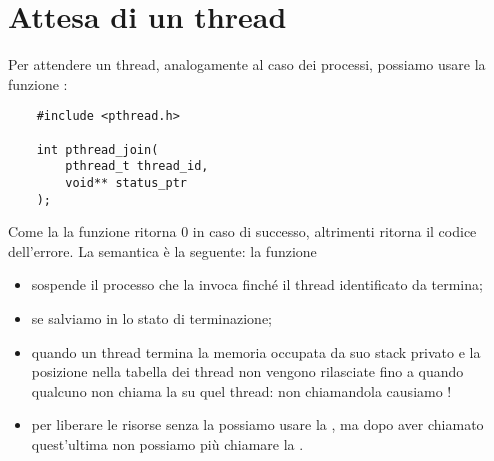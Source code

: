 \section{Attesa di un thread}

Per attendere un thread, analogamente al caso dei processi, possiamo usare la funzione :

\begin{verbatim}
    #include <pthread.h>

    int pthread_join(
        pthread_t thread_id,
        void** status_ptr
    );
\end{verbatim}

Come la  la funzione ritorna $0$ in caso di successo, altrimenti ritorna il codice dell'errore. La semantica è la seguente: la funzione 
\begin{itemize}
    \item sospende il processo che la invoca finché il thread identificato da  termina;
    \item se  salviamo in  lo stato di terminazione;
    \item quando un thread termina la memoria occupata da suo stack privato e la posizione nella tabella dei thread non vengono rilasciate fino a quando qualcuno non chiama la  su quel thread: non chiamandola causiamo !
    \item per liberare le risorse senza la  possiamo usare la , ma dopo aver chiamato quest'ultima non possiamo più chiamare la .
\end{itemize}